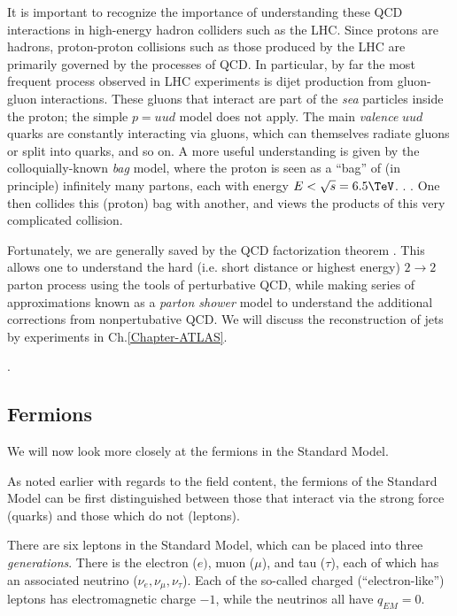 It is important to recognize the importance of understanding these QCD interactions in high-energy hadron colliders such as the LHC.
Since protons are hadrons, proton-proton collisions such as those produced by the LHC are primarily governed by the processes of QCD.
In particular, by far the most frequent process observed in LHC experiments is dijet production from gluon-gluon interactions.
These gluons that interact are part of the \textit{sea} particles inside the proton; the simple $p = uud$ model does not apply.
The main \textit{valence} $uud$ quarks are constantly interacting via gluons, which can themselves radiate gluons or split into quarks, and so on.
A more useful understanding is given by the colloquially-known \textit{bag} model, where the proton is seen as a ``bag'' of (in principle) infinitely many partons, each with energy $ E < \sqrt{s} = 6.5 \TeV$.
.
.
One then collides this (proton) bag with another, and views the products of this very complicated collision.

Fortunately, we are generally saved by the QCD factorization theorem .
This allows one to understand the hard (i.e. short distance or highest energy) $2 \rightarrow 2$ parton process using the tools of perturbative QCD, while making series of approximations known as a \textit{parton shower} model to understand the additional corrections from nonpertubative QCD.
We will discuss the reconstruction of jets by experiments in Ch.\ref{Chapter-ATLAS}.

.

\subsection{Fermions}

We will now look more closely at the fermions in the Standard Model.

As noted earlier with regards to the field content, the fermions of the Standard Model can be first distinguished between those that interact via the strong force (quarks) and those which do not (leptons).

There are six leptons in the Standard Model, which can be placed into three \textit{generations}. 
There is the electron ($e)$, muon ($\mu$), and tau ($\tau$), each of which has an associated neutrino ($\nu_e, \nu_\mu, \nu_\tau$).
Each of the so-called charged (``electron-like'') leptons has electromagnetic charge $-1$, while the neutrinos all have $q_{EM} = 0$.

